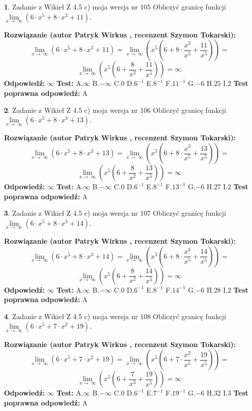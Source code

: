 \documentclass[12pt, a4paper]{article}
\theoremstyle{definition} %
\newtheorem{zad}{}
\newcommand{\zadStart}[1]{\begin{zad}#1\newline}
\newcommand{\zadStop}{\end{zad}}
\newcommand{\rozwStart}[2]{\noindent \textbf{Rozwiązanie (autor #1 , recenzent #2): }\newline}
\newcommand{\rozwStop}{\newline}
\newcommand{\odpStart}{\noindent \textbf{Odpowiedź:}\newline}
\newcommand{\odpStop}{\newline}
\newcommand{\testStart}{\noindent \textbf{Test:}\newline}
\newcommand{\testStop}{\newline}
\newcommand{\kluczStart}{\noindent \textbf{Test poprawna odpowiedź:}\newline}
\newcommand{\kluczStop}{\newline}
\begin{document}
\zadStart{Zadanie z Wikieł Z 4.5 c) moja wersja nr 105}
Obliczyć granicę funkcji  $\lim\limits_{x\to\ \infty}(6 \cdot x^{5}+8 \cdot x^{3}+11)$.
\zadStop
\rozwStart{Patryk Wirkus}{Szymon Tokarski}
$$\lim\limits_{x\to\ \infty}(6 \cdot x^{5}+8 \cdot x^{3}+11) = \lim\limits_{x\to\ \infty}(x^{5}(6 +8 \cdot \frac{x^{3}}{x^{5}}+\frac{11}{x^{5}})) =$$ $$\lim\limits_{x\to\ \infty}(x^{5}(6 +\frac{8}{x^{2}}+\frac{11}{x^{5}})) =\infty$$
\rozwStop
\odpStart
$\infty$
\odpStop
\testStart
A.$\infty$ B.$-\infty$ C.$0$ D.$6^{-1}$ E.$8^{-1}$
F.$11^{-1}$ G.$-6$
H.$25$
I.$2$
\testStop
\kluczStart
A
\kluczStop



\zadStart{Zadanie z Wikieł Z 4.5 c) moja wersja nr 106}
Obliczyć granicę funkcji  $\lim\limits_{x\to\ \infty}(6 \cdot x^{5}+8 \cdot x^{3}+13)$.
\zadStop
\rozwStart{Patryk Wirkus}{Szymon Tokarski}
$$\lim\limits_{x\to\ \infty}(6 \cdot x^{5}+8 \cdot x^{3}+13) = \lim\limits_{x\to\ \infty}(x^{5}(6 +8 \cdot \frac{x^{3}}{x^{5}}+\frac{13}{x^{5}})) =$$ $$\lim\limits_{x\to\ \infty}(x^{5}(6 +\frac{8}{x^{2}}+\frac{13}{x^{5}})) =\infty$$
\rozwStop
\odpStart
$\infty$
\odpStop
\testStart
A.$\infty$ B.$-\infty$ C.$0$ D.$6^{-1}$ E.$8^{-1}$
F.$13^{-1}$ G.$-6$
H.$27$
I.$2$
\testStop
\kluczStart
A
\kluczStop



\zadStart{Zadanie z Wikieł Z 4.5 c) moja wersja nr 107}
Obliczyć granicę funkcji  $\lim\limits_{x\to\ \infty}(6 \cdot x^{5}+8 \cdot x^{3}+14)$.
\zadStop
\rozwStart{Patryk Wirkus}{Szymon Tokarski}
$$\lim\limits_{x\to\ \infty}(6 \cdot x^{5}+8 \cdot x^{3}+14) = \lim\limits_{x\to\ \infty}(x^{5}(6 +8 \cdot \frac{x^{3}}{x^{5}}+\frac{14}{x^{5}})) =$$ $$\lim\limits_{x\to\ \infty}(x^{5}(6 +\frac{8}{x^{2}}+\frac{14}{x^{5}})) =\infty$$
\rozwStop
\odpStart
$\infty$
\odpStop
\testStart
A.$\infty$ B.$-\infty$ C.$0$ D.$6^{-1}$ E.$8^{-1}$
F.$14^{-1}$ G.$-6$
H.$28$
I.$2$
\testStop
\kluczStart
A
\kluczStop



\zadStart{Zadanie z Wikieł Z 4.5 c) moja wersja nr 108}
Obliczyć granicę funkcji  $\lim\limits_{x\to\ \infty}(6 \cdot x^{5}+7 \cdot x^{2}+19)$.
\zadStop
\rozwStart{Patryk Wirkus}{Szymon Tokarski}
$$\lim\limits_{x\to\ \infty}(6 \cdot x^{5}+7 \cdot x^{2}+19) = \lim\limits_{x\to\ \infty}(x^{5}(6 +7 \cdot \frac{x^{2}}{x^{5}}+\frac{19}{x^{5}})) =$$ $$\lim\limits_{x\to\ \infty}(x^{5}(6 +\frac{7}{x^{3}}+\frac{19}{x^{5}})) =\infty$$
\rozwStop
\odpStart
$\infty$
\odpStop
\testStart
A.$\infty$ B.$-\infty$ C.$0$ D.$6^{-1}$ E.$7^{-1}$
F.$19^{-1}$ G.$-6$
H.$32$
I.$3$
\testStop
\kluczStart
A
\kluczStop
\end{document}
